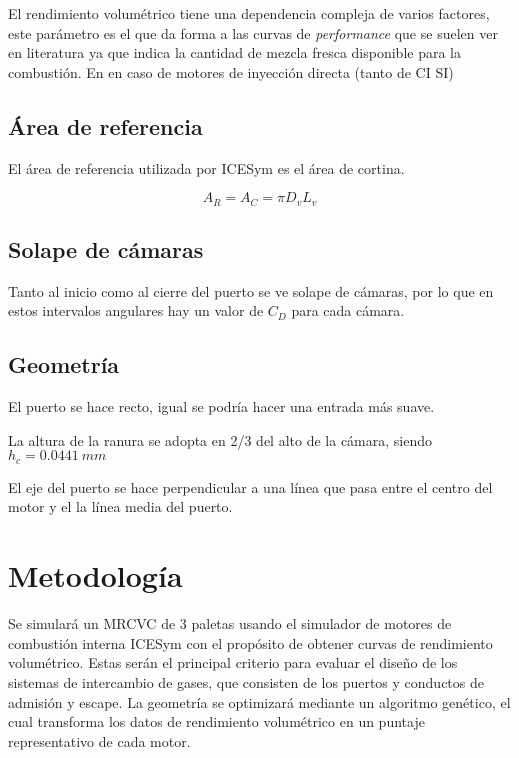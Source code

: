 El rendimiento volumétrico tiene una dependencia compleja de varios factores,
este parámetro es el que da forma a las curvas de \emph{performance} que se
suelen ver en literatura ya que indica la cantidad de mezcla fresca disponible
para la combustión. En en caso de motores de inyección directa (tanto de CI SI)


\subsection{Área de referencia}
El área de referencia utilizada por ICESym es el área de cortina.

$$ A_R = A_C = \pi D_v L_v $$

\subsection{Solape de cámaras}
Tanto al inicio como al cierre del puerto se ve solape de cámaras, por lo que
en estos intervalos angulares hay un valor de $C_D$ para cada cámara.

\subsection{Geometría}
El puerto se hace recto, igual se podría hacer una entrada más suave.

La altura de la ranura se adopta en 2/3 del alto de la cámara, siendo $h_c=0.0441\ mm$

El eje del puerto se hace perpendicular a una línea que pasa entre el centro
del motor y el la línea media del puerto.





\section{Metodología}

Se simulará un MRCVC de 3 paletas usando el simulador de motores de combustión
interna ICESym \cite{icesym} con el propósito de obtener curvas de rendimiento
volumétrico.
%
Estas serán el principal criterio para evaluar el diseño de los sistemas de
intercambio de gases, que consisten de los puertos y conductos de admisión y
escape.
%
La geometría se optimizará mediante un algoritmo genético, el cual transforma
los datos de rendimiento volumétrico en un puntaje representativo de cada
motor.


